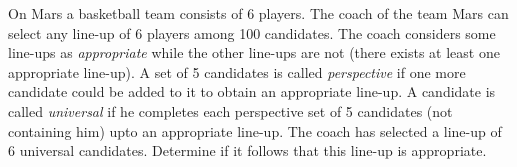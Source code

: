 On Mars a basketball team consists of 6 players. The coach of the team Mars can select  any line-up of 6 players among 100 candidates. The coach considers some line-ups as \textit{appropriate} while the other line-ups are not (there exists at least one appropriate line-up). A set of 5 candidates is called \textit{perspective} if one more candidate could be added to it to obtain an appropriate line-up. A candidate is called \textit{universal} if he completes each perspective set of 5 candidates (not containing him) upto an appropriate line-up. The coach has selected a line-up of 6 universal candidates. Determine if it follows that this line-up is appropriate.